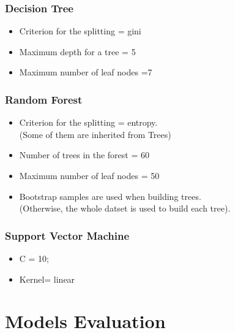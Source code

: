 \documentclass[12pt]{article}
\begin{document}
\subsubsection{Decision Tree}

\begin{itemize}
\item Criterion for the splitting = gini
\item Maximum depth for a tree = 5
\item Maximum number of leaf nodes =7
\end{itemize}


\subsubsection{Random Forest}

\begin{itemize}
\item Criterion for the splitting = entropy. \\ (Some of them are inherited from Trees)
\item Number of trees in the forest = 60
\item Maximum number of leaf nodes = 50
\item Bootstrap samples are used when building trees. \\ (Otherwise, the whole datset is used to build each tree).
\end{itemize}

\subsubsection{Support Vector Machine}

\begin{itemize}
\item C = 10;
\item Kernel= linear
\end{itemize}
                            

\section{Models Evaluation}
\end{document}
